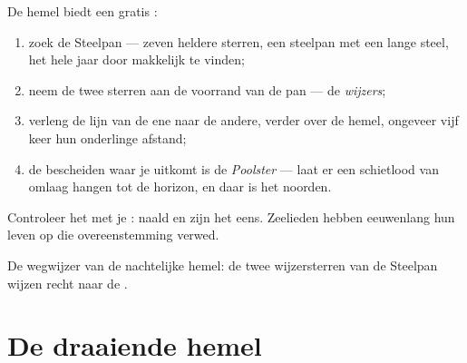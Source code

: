 \begin{method}\label{met:g5:stars-night-sky:northstar}
De hemel biedt een gratis :
\begin{enumerate}
  \item zoek de Steelpan --- zeven heldere sterren, een steelpan met
        een lange steel, het hele jaar door makkelijk te vinden;
  \item neem de twee sterren aan de voorrand van de pan --- de
        \emph{wijzers};
  \item verleng de lijn van de ene naar de andere, verder over de
        hemel, ongeveer vijf keer hun onderlinge afstand;
  \item de bescheiden  waar je uitkomt is de
        \emph{Poolster} --- laat er een schietlood van
        omlaag hangen tot de horizon, en daar is het noorden.
\end{enumerate}
Controleer het met je : naald en  zijn het eens. Zeelieden
hebben eeuwenlang hun leven op die overeenstemming verwed.
\end{method}

\begin{omfigure}

{\small De wegwijzer van de nachtelijke hemel: de twee wijzersterren
van de Steelpan wijzen recht naar de .}
\end{omfigure}

\section{De draaiende hemel}

